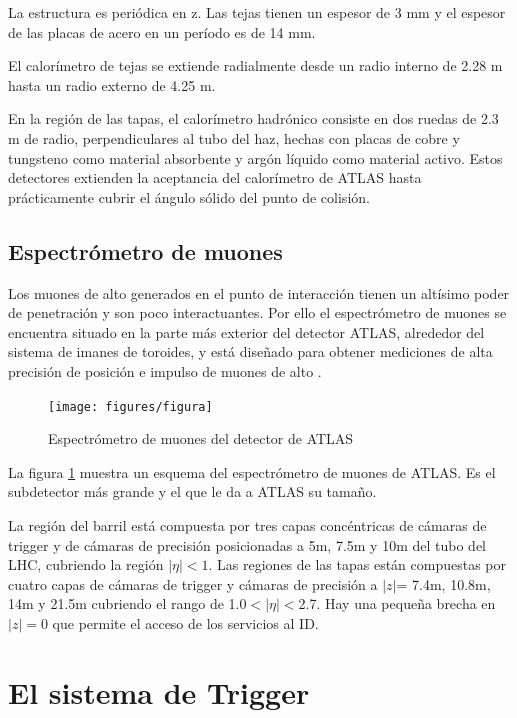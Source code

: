 La estructura es periódica en z. Las tejas tienen un espesor de 3 mm y el
espesor de las placas de acero en un período es de 14 mm.

El calorímetro de tejas se extiende radialmente desde un radio interno de 2.28 m
hasta un radio externo de 4.25 m.

En la región de las tapas, el calorímetro hadrónico consiste en dos ruedas de 2.3 m de
radio, perpendiculares al tubo del haz, hechas con placas de cobre y tungsteno como material
absorbente y argón líquido como material activo.
Estos detectores extienden la aceptancia del calorímetro de ATLAS hasta prácticamente
cubrir el ángulo sólido del punto de colisión.


\subsection{Espectrómetro de muones}
Los muones de alto {\pt} generados en el punto de interacción tienen un altísimo poder de
penetración y son poco interactuantes.
Por ello el espectrómetro de muones \cite{muonTDR} se encuentra situado en la parte más
exterior del detector ATLAS, alrededor del sistema de imanes de toroides,
y está diseñado para obtener mediciones de alta precisión de posición e impulso de muones de alto \pt.

\begin{figure}[H]
  \centering
  \texttt{[image: figures/figura]}
  \caption{Espectrómetro de muones del detector de ATLAS}\label{fig:especmuones}
\end{figure}

La figura \ref{fig:especmuones} muestra un esquema del espectrómetro de muones de ATLAS.
Es el subdetector más grande y el que le da a ATLAS su tamaño.

La región del barril está compuesta por tres capas concéntricas de cámaras de trigger
y de cámaras de precisión posicionadas a  5m, 7.5m y 10m del tubo del LHC, cubriendo
la región $|\eta|<1$.
Las regiones de las tapas están compuestas por cuatro capas de cámaras de trigger y
cámaras de precisión a $|z|$= 7.4m, 10.8m, 14m y 21.5m cubriendo el rango de 1.0$<|\eta|<$2.7.
Hay una pequeña brecha en $|z|=0$ que permite el acceso de los servicios al ID.

\section{El sistema de Trigger}

